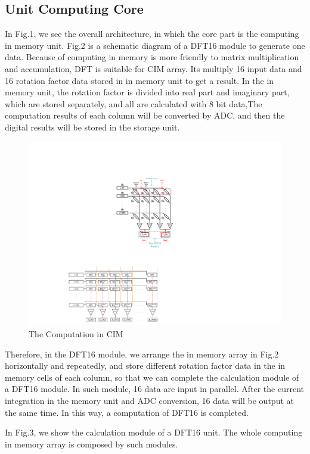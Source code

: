 \documentclass[journal]{IEEEtran}
\begin{document}
\subsection{Unit Computing Core}
In Fig.1, we see the overall architecture, in which the core part is the computing in memory unit. Fig.2 is a schematic diagram of a DFT16 module to generate one data. Because of computing in memory is more friendly to matrix multiplication and accumulation, DFT is suitable for CIM array. Its multiply 16 input data and 16 rotation factor data stored in in memory unit to get a result. In the in memory unit, the rotation factor is divided into real part and imaginary part, which are stored separately, and all are calculated with 8 bit data,The computation results of each column will be converted by ADC, and then the digital results will be stored in the storage unit.
\begin{figure}[h]
\centering
\includegraphics[scale=0.8]{figures/figure2}
\caption{The Computation in CIM}
\end{figure}

Therefore, in the DFT16 module, we arrange the in memory array in Fig.2 horizontally and repeatedly, and store different rotation factor data in the in memory cells of each column, so that we can complete the calculation module of a DFT16 module. In such module, 16 data are input in parallel. After the current integration in the memory unit and ADC conversion, 16 data will be output at the same time. In this way, a computation of DFT16 is completed.

In Fig.3, we show the calculation module of a DFT16 unit. The whole computing in memory array is composed by such modules.
\end{document}
